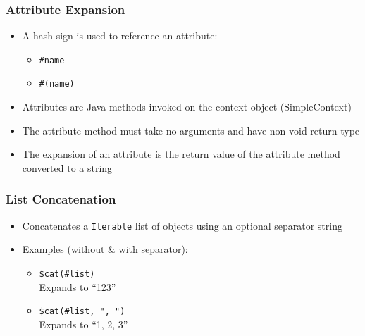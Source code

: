 \documentclass[a4paper,12pt,presentation]{beamer}
\begin{document}
\begin{frame}[fragile]
    \frametitle{Attribute Expansion}

    \begin{itemize}
        \item A hash sign is used to reference an attribute:
            \begin{itemize}
                \item \verb'#name'
                \item \verb'#(name)'
            \end{itemize}
        \item Attributes are Java methods invoked on the context object
            (SimpleContext)
        \item The attribute method must take no arguments and have non-void
            return type
        \item The expansion of an attribute is the return value of the
            attribute method converted to a string
    \end{itemize}
    
\end{frame}

\begin{frame}[fragile]
    \frametitle{List Concatenation}
    \begin{itemize}
        \item Concatenates a \verb'Iterable' list of objects using an optional
            separator string
        \item Examples (without \& with separator):
            \begin{itemize}
                \item \verb'$cat(#list)' \\
                    Expands to ``123''
                \item \verb'$cat(#list, ", ")' \\
                    Expands to ``1, 2, 3''
            \end{itemize}
    \end{itemize}
\end{frame}
\end{document}

